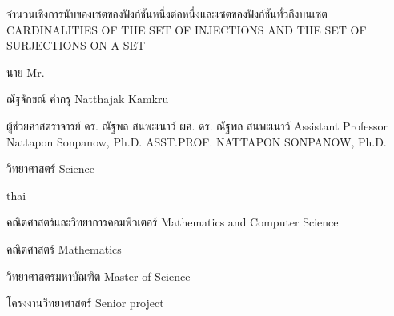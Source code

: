 
\thesistitle
{จำนวนเชิงการนับของเซตของฟังก์ชันหนึ่งต่อหนึ่งและเซตของฟังก์ชันทั่วถึงบนเซต}
{CARDINALITIES OF THE SET OF INJECTIONS AND THE SET OF SURJECTIONS ON A SET}

\authortitle   
{นาย}
{Mr.}

\thesisauthor
{ณัฐจักขณ์ คำกรุ}
{Natthajak Kamkru}

\advisor
{ผู้ช่วยศาสตราจารย์ ดร. ณัฐพล สนพะเนาว์}
{ผศ. ดร. ณัฐพล สนพะเนาว์}
{Assistant Professor Nattapon Sonpanow, Ph.D.}
{ASST.PROF. NATTAPON SONPANOW, Ph.D.}

\faculty
{วิทยาศาสตร์}
{Science}

\begin{hyphenrules}{thai}
\end{hyphenrules}
\department                             
{คณิตศาสตร์และวิทยาการคอมพิวเตอร์}
{Mathematics and Computer Science}

\fieldofstudy
{คณิตศาสตร์}
{Mathematics}

\degree
{วิทยาศาสตรมหาบัณฑิต}                   
{ Master of Science}



\subjName
{โครงงานวิทยาศาสตร์}
{Senior project}


